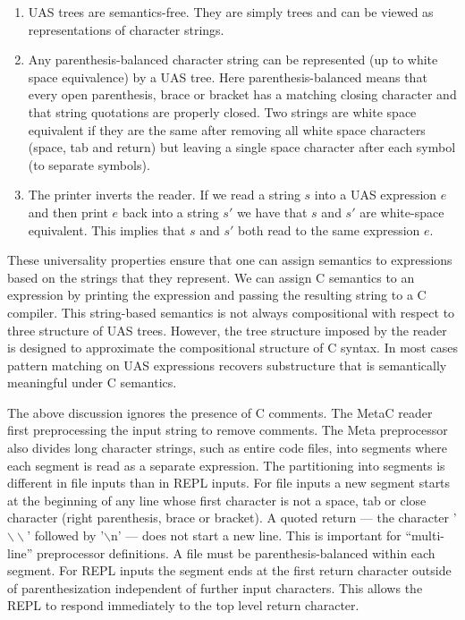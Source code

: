 \documentclass{article}
\begin{document}
\begin{enumerate}
\item UAS trees are semantics-free.  They are simply trees and can be viewed as representations of character strings.

\item Any parenthesis-balanced character string can be represented (up to white space equivalence) by a UAS tree. Here parenthesis-balanced means that every open parenthesis, brace or bracket has a matching closing character and that string quotations
  are properly closed.  Two strings are white space equivalent if they are the same after removing all white space characters (space, tab and return) but leaving a single space character after each symbol (to separate symbols).

\item The printer inverts the reader. If we read a string $s$ into a UAS expression $e$ and then print $e$ back into a string $s'$ we have that $s$ and $s'$ are white-space equivalent.  This implies that $s$ and $s'$ both read to the same expression $e$.
\end{enumerate}

These universality properties ensure that one can assign semantics to expressions based on the strings that they represent.  We can assign C semantics to an expression by printing the expression and passing the resulting string to a C compiler.
This string-based semantics is not always compositional with respect to three structure of UAS trees.  However, the tree structure imposed by the reader is designed to approximate the compositional structure of C syntax.  In most cases
pattern matching on UAS expressions recovers substructure that is semantically meaningful under C semantics.

The above discussion ignores the presence of C comments. The MetaC reader first preprocessing the input string to remove comments.
The Meta preprocessor also divides long character strings, such as entire code files, into segments where each segment is read as a separate expression.
The partitioning into segments is different in file inputs than in REPL inputs.
For file inputs a new segment starts at the beginning of any line whose first character is not a space, tab or close character (right parenthesis, brace or bracket).
A quoted return --- the character '$\backslash\backslash$' followed by '$\backslash$n' --- does not start a new line.  This is important for ``multi-line'' preprocessor definitions.
A file must be parenthesis-balanced within each segment.
For REPL inputs the segment ends at the first return character outside of parenthesization independent of further input characters.  This allows the REPL to respond immediately
to the top level return character.
\end{document}
